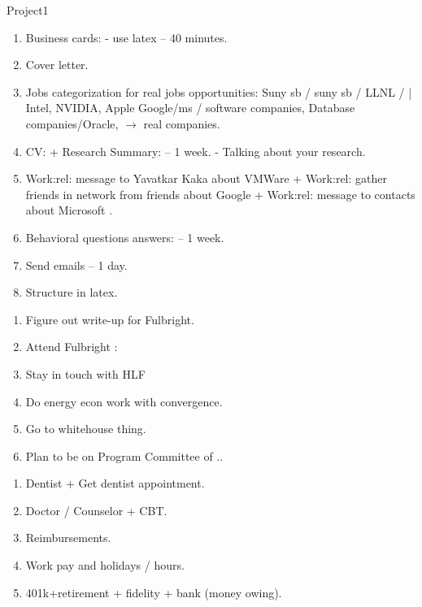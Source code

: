 \begin{columns}
\begin{column}{0.333\columnwidth}
\begin{block}{Project1}
\begin{enumerate}
\tiny \item \tiny Business cards:  - use latex  -- 40 minutes. 
\item \tiny Cover letter. 
\item \tiny Jobs categorization for real jobs opportunities: Suny sb /
  suny sb / LLNL /  |  Intel, NVIDIA, Apple  Google/ms / software
  companies, Database companies/Oracle, $\rightarrow$ real companies. 
\item \tiny CV: + Research Summary:  -- 1 week.  - Talking about your research.
\item \tiny Work:rel: message to Yavatkar Kaka about VMWare +
  Work:rel: gather friends in network from friends about Google +
  Work:rel: message to contacts about Microsoft \te{} \dl{} \pr{}. 
\item \tiny Behavioral questions answers:    -- 1 week. 
\item \tiny Send emails – 1 day. 
\item \tiny Structure in latex. 
\end{enumerate}
\begin{enumerate} 
\tiny \item \tiny Figure out write-up for Fulbright. 
\item \tiny Attend Fulbright : 
\item \tiny Stay in touch with HLF 
\item \tiny Do energy econ work with convergence. 
\item \tiny Go to whitehouse thing. 
\item \tiny Plan to be on Program Committee of .. 
\end{enumerate}
\begin{enumerate}
\tiny \item \tiny Dentist + Get dentist appointment.
\item \tiny Doctor / Counselor + CBT.
\item \tiny Reimbursements.
\item \tiny Work pay and holidays / hours.
\item \tiny 401k+retirement  + fidelity + bank (money owing).

\end{enumerate}
\end{block}
\end{column}
\end{columns}
